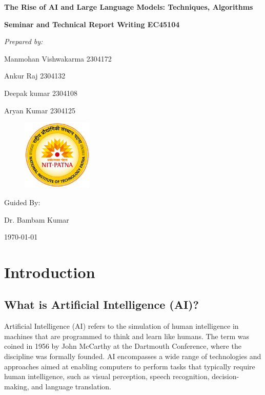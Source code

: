 \documentclass[11pt,a4paper]{report}
\begin{document}
\begin{titlepage}
    \centering
    \vspace*{1cm}
    {\Huge\bfseries The Rise of AI and Large Language Models: Techniques, Algorithms\par}
    \vspace{1.5cm}
    {\Large\textbf{Seminar and Technical Report Writing EC45104}}
    
    \vspace{2cm}
    {\Large\itshape Prepared by:\par}
    \vspace{0.5cm}
    {\Large Manmohan Vishwakarma 2304172\par}
    \vspace{0.5cm}
    {\Large Ankur Raj 2304132\par}
    \vspace{0.5cm}
    {\Large Deepak kumar 2304108\par}
    \vspace{0.5cm}
    {\Large Aryan Kumar 2304125\par}
    \vspace{0.5cm}
    \begin{figure}[ht]
    \centering
    \includegraphics[width=0.3\textwidth]{National_Institute_of_Technology,_Patna_Logo.png}
    
\end{figure}
    {\Large Guided By:\par}
    \vspace{0.5cm}
    {\Large Dr. Bambam Kumar\par}
    \vfill
    {\large \today\par}
\end{titlepage}

\tableofcontents
\listoffigures


\chapter{Introduction}
\section{What is Artificial Intelligence (AI)?}
Artificial Intelligence (AI) refers to the simulation of human intelligence in machines that are programmed to think and learn like humans. The term was coined in 1956 by John McCarthy at the Dartmouth Conference, where the discipline was formally founded. AI encompasses a wide range of technologies and approaches aimed at enabling computers to perform tasks that typically require human intelligence, such as visual perception, speech recognition, decision-making, and language translation.
\end{document}
